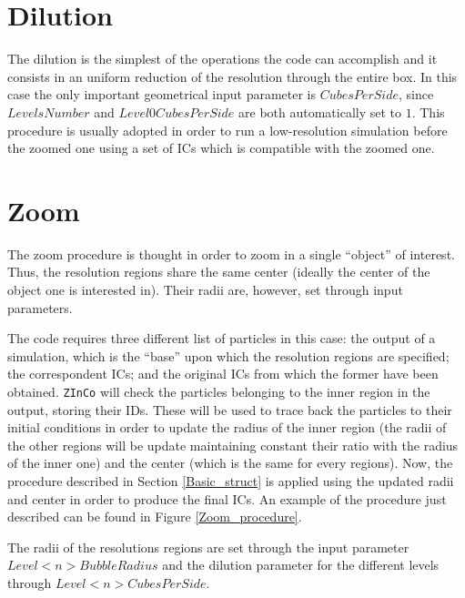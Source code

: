 \documentclass[11pt,a4paper,titlepage]{article}
\newcommand{\virg}[1]{``{#1}''}
\newcommand{\zinco}{\texttt{ZInCo}\xspace}
\begin{document}
\section{Dilution}
The dilution is the simplest of the operations the code can accomplish and it consists in an uniform reduction of the resolution through the entire box. In this case the only important geometrical input parameter is $CubesPerSide$, since $LevelsNumber$ and $Level0CubesPerSide$ are both automatically set to $1$. This procedure is usually adopted in order to run a low-resolution simulation before the zoomed one using a set of ICs which is compatible with the zoomed one.

\section{Zoom}
The zoom procedure is thought in order to zoom in a single \virg{object} of interest. Thus, the resolution regions share the same center (ideally the center of the object one is interested in). Their radii are, however, set through input parameters.

The code requires three different list of particles in this case: the output of a simulation, which is the \virg{base} upon which the resolution regions are specified; the correspondent ICs; and the original ICs from which the former have been obtained. \zinco will check the particles belonging to the inner region in the output, storing their IDs. These will be used to trace back the particles to their initial conditions in order to update the radius of the inner region (the radii of the other regions will be update maintaining constant their ratio with the radius of the inner one) and the center (which is the same for every regions). Now, the procedure described in Section \ref{Basic_struct} is applied using the updated radii and center in order to produce the final ICs. An example of the procedure just described can be found in Figure \ref{Zoom_procedure}.

The radii of the resolutions regions are set through the input parameter $Level<n>BubbleRadius$ and the dilution parameter for the different levels through $Level<n>CubesPerSide$.
\end{document}
